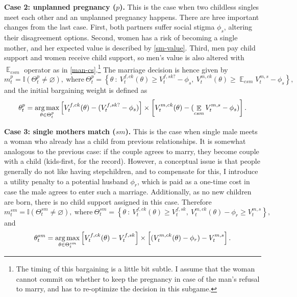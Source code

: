 \documentclass[12pt,letter]{article}
\DeclareMathOperator*{\argmax}{\mathrm{arg\,max}}
\DeclareMathOperator{\E}{\mathbb{E}}
\newcommand{\I}{\mathbb{I}}
\begin{document}
\textbf{Case 2: unplanned pregnancy ($p$).} This is the case when two childless singles meet each other and an unplanned pregnancy happens. There are hree important changes from the last case. First, both partners suffer social stigma $\phi_s$, altering their disagreement options. Second, women has a risk of becoming a single mother, and her expected value is described by \ref{sm-value}. Third, men pay child support and women receive child support, so men's value is also altered with $\E_{csm}$ operator as in \ref{man-cs}.\footnote{The timing of this bargaining is a little bit subtle. I assume that the woman cannot commit on whether to keep the pregnancy in case of the man's refusal to marry, and has to re-optimize the decision in this subgame.} The marriage decision is hence given by
\[m^{p}_t = \I(\Theta^{p}_t \neq \varnothing), \ \text{where} \ \Theta^{p}_t = \left\{ \theta \ : \ V_t^{f,ck}(\theta) \geq V_t^{f,sk?} - \phi_s, \ V_t^{m,ck}(\theta) \geq \E_{csm} V_t^{m,s} - \phi_s \right\},\]
and the initial bargaining weight is defined as
\begin{equation}\label{bargaining-problem-upp}\theta^{p}_t = \argmax\limits_{\theta\in \Theta^{p}_t} \left[ V_t^{f,ck}(\theta) - (V_t^{f,sk?} - \phi_s)  \right] \times \left[ \vphantom{ V_t^{f,ck}(\theta)}V_t^{m,ck}(\theta) - (\E_{csm} V_t^{m,s} - \phi_s) \right].\end{equation}

\textbf{Case 3: single mothers match ($sm$).} This is the case when single male meets a woman who already has a child from previous relationships. It is somewhat analogous to the previous case: if the couple agrees to marry, they become couple with a child (kids-first, for the record). However, a conceptual issue is that people generally do not like having stepchildren, and to compensate for this, I introduce a utility penalty to a potential husband $\phi_r$, which is paid as a one-time cost in case the male agrees to enter such a marriage. Additionally, as no new children are born, there is no child support assigned in this case. Therefore
\[m^{sm}_t = \I(\Theta^{sm}_t \neq \varnothing), \ \text{where} \ \Theta^{sm}_t = \left\{ \theta \ : \ V_t^{f,ck}(\theta) \geq V_t^{f,sk}, \ V_t^{m,ck}(\theta) - \phi_r \geq V_t^{m,s}   \right\},\]
and
\begin{equation}\theta^{sm}_t = \argmax\limits_{\theta\in \Theta^{sm}_t} \left[ V_t^{f,ck}(\theta) - V_t^{f,sk}  \right] \times \left[ \vphantom{ V_t^{f,ck}(\theta)} (V_t^{m,ck}(\theta) - \phi_r) - V_t^{m,s} \right].\end{equation}
\end{document}
